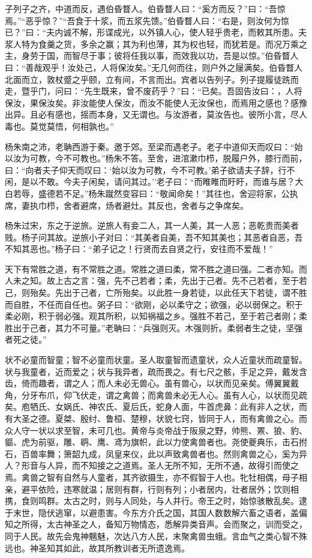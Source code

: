 \documentclass[]{article}
\begin{document}
子列子之齐，中道而反，遇伯昏瞀人。伯昏瞀人曰：``奚方而反？''曰：``吾惊焉。''``恶乎惊？''``吾食于十浆，而五浆先馈。''伯昏瞀人曰：``右是，则汝何为惊已？''曰：``夫内诚不解，形谍成光，以外镇人心，使人轻乎贵老，而敕其所患。夫浆人特为食羹之货，多余之赢；其为利也薄，其为权也轻，而犹若是。而况万乘之主，身劳于国，而智尽于事；彼将任我以事，而效我以功，吾是以惊。''伯昏瞀人曰：``善哉观乎！汝处己，人将保汝矣。''无几何而往，则户外之屦满矣。伯昏瞀人北面而立，敦杖蹙之乎颐，立有间，不言而出。宾者以告列子。列子提履徒跣而走，暨乎门，问曰：``先生既来，曾不废药乎？''曰：``已矣。吾固告汝曰：，人将保汝，果保汝矣。非汝能使人保汝，而汝不能使人无汝保也，而焉用之感也？感豫出异。且必有感也，摇而本身，又无谓也。与汝游者，莫汝告也。彼所小言，尽人毒也。莫觉莫悟，何相孰也。''

杨朱南之沛，老聃西游于秦。邀于郊。至梁而遇老子。老子中道仰天而叹曰：``始以汝为可教，今不可教也。''杨朱不答。至舍，进涫漱巾栉，脱履户外，膝行而前，曰：``向者夫子仰天而叹曰：`始以汝为可教，今不可教。'弟子欲请夫子辞，行不闲，是以不敢。今夫子闲矣，请问其过。''老子曰：``而睢睢而盱盱，而谁与居？大白若辱，盛德若不足。''杨朱蹴然变容曰：``敬闻命矣！''其往也，舍迎将家，公执席，妻执巾栉，舍者避席，炀者避灶。其反也，舍者与之争席矣。

杨朱过宋，东之于逆旅。逆旅人有妾二人，其一人美，其一人恶；恶乾贵而美者贱。杨子问其故。逆旅小子对曰：``其美者自美，吾不知其美也；其恶者自恶，吾不知其恶也。''杨子曰：``弟子记之！行贤而去自贤之行，安往而不爱哉！''

天下有常胜之道，有不常胜之道。常胜之道曰柔，常不胜之道曰强。二者亦知。而人未之知。故上古之言：强，先不己若者；柔，先出于己者。先不己若者，至于若己，则殆矣。先出于己者，亡所殆矣。以此胜一身若徒，以此任天下若徒，谓不胜而自胜，不任而自任也。粥子曰：``欲刚，必以柔守之；欲强，必以弱保之。积于柔必刚，积于弱必强。观其所积，以知祸福之乡。强胜不若己，至于若己者刚；柔胜出于己者，其力不可量。''老聃曰：``兵强则灭。木强则折。柔弱者生之徒，坚强者死之徒。''

状不必童而智童；智不必童而状童。圣人取童智而遗童状，众人近童状而疏童智。状与我童者，近而爱之；状与我异者，疏而畏之。有七尺之骸，手足之异，戴发含齿，倚而趣者，谓之人；而人未必无兽心。虽有兽心，以状而见亲矣。傅翼翼戴角，分牙布爪，仰飞伏走，谓之禽兽；而禽兽未必无人心。虽有人心，以状而见疏矣。庖牺氏、女娲氏、神农氏、夏后氏，蛇身人面，牛首虎鼻：此有非人之状，而有大圣之德。夏桀、殷纣、鲁桓、楚穆，状貌七窍，皆同于人，而有禽兽之心。而众人守一状以求至智，未可几也。黄帝与炎帝战于阪泉之野，帅熊、罴、狼、豹、貙、虎为前驱，雕、鹖、鹰、鸢为旗帜，此以力使禽兽者也。尧使夔典乐，击石拊石，百兽率舞；箫韶九成，凤皇来仪，此以声致禽兽者也。然则禽兽之心，奚为异人？形音与人异，而不知接之之道焉。圣人无所不知，无所不通，故得引而使之焉。禽兽之智有自然与人童者，其齐欲摄生，亦不假智于人也。牝牡相偶，母子相亲，避平依险，违寒就温；居则有群，行则有列；小者居内，壮者居外；饮则相携，食则鸣群。太古之时，则与人同处，与人并行。帝王之时，始惊骇散乱矣。逮于末世，隐伏逃窜，以避患害。今东方介氏之国，其国人数数解六畜之语者，盖偏知之所得，太古神圣之人，备知万物情态，悉解异类音声。会而聚之，训而受之，同于人民。故先会鬼神魑魅，次达八方人民，末聚禽兽虫蛾。言血气之类心智不殊远也。神圣知其如此，故其所教训者无所遗逸焉。
\end{document}
